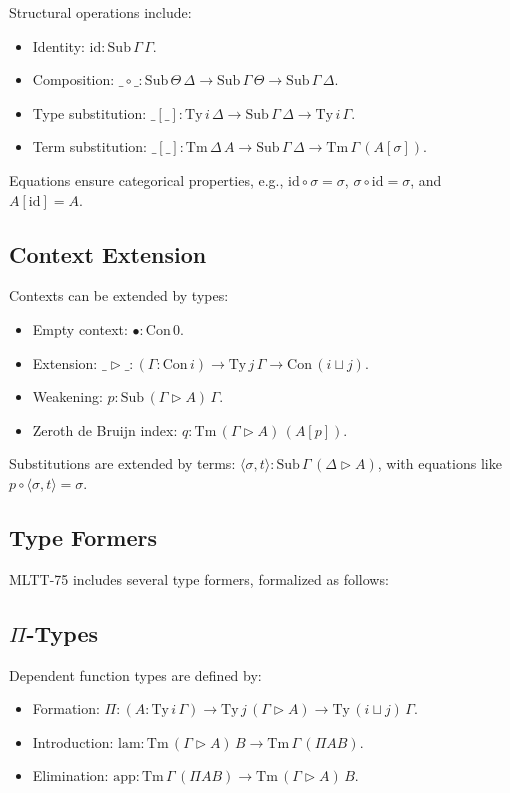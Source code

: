 \documentclass{article}
\begin{document}
Structural operations include:
\begin{itemize}
    \item Identity: \(\mathrm{id} : \mathrm{Sub}\, \Gamma\, \Gamma\).
    \item Composition: \(\_\circ\_ : \mathrm{Sub}\, \Theta\, \Delta \to \mathrm{Sub}\, \Gamma\, \Theta \to \mathrm{Sub}\, \Gamma\, \Delta\).
    \item Type substitution: \(\_[\_] : \mathrm{Ty}\, i\, \Delta \to \mathrm{Sub}\, \Gamma\, \Delta \to \mathrm{Ty}\, i\, \Gamma\).
    \item Term substitution: \(\_[\_] : \mathrm{Tm}\, \Delta\, A \to \mathrm{Sub}\, \Gamma\, \Delta \to \mathrm{Tm}\, \Gamma\, (A[\sigma])\).
\end{itemize}

Equations ensure categorical properties, e.g., \(\mathrm{id} \circ \sigma = \sigma\), \(\sigma \circ \mathrm{id} = \sigma\), and \(A[\mathrm{id}] = A\).

\subsection{Context Extension}
Contexts can be extended by types:
\begin{itemize}
    \item Empty context: \(\bullet : \mathrm{Con}\, 0\).
    \item Extension: \(\_\triangleright\_ : (\Gamma : \mathrm{Con}\, i) \to \mathrm{Ty}\, j\, \Gamma \to \mathrm{Con}\, (i \sqcup j)\).
    \item Weakening: \(p : \mathrm{Sub}\, (\Gamma \triangleright A)\, \Gamma\).
    \item Zeroth de Bruijn index: \(q : \mathrm{Tm}\, (\Gamma \triangleright A)\, (A[p])\).
\end{itemize}

Substitutions are extended by terms: \(\langle\sigma, t\rangle : \mathrm{Sub}\, \Gamma\, (\Delta \triangleright A)\), with equations like \(p \circ \langle\sigma, t\rangle = \sigma\).

\subsection{Type Formers}
MLTT-75 includes several type formers, formalized as follows:

\subsection{\(\Pi\)-Types}
Dependent function types are defined by:
\begin{itemize}
    \item Formation: \(\Pi : (A : \mathrm{Ty}\, i\, \Gamma) \to \mathrm{Ty}\, j\, (\Gamma \triangleright A) \to \mathrm{Ty}\, (i \sqcup j)\, \Gamma\).
    \item Introduction: \(\mathrm{lam} : \mathrm{Tm}\, (\Gamma \triangleright A)\, B \to \mathrm{Tm}\, \Gamma\, (\Pi A B)\).
    \item Elimination: \(\mathrm{app} : \mathrm{Tm}\, \Gamma\, (\Pi A B) \to \mathrm{Tm}\, (\Gamma \triangleright A)\, B\).
\end{itemize}
\end{document}
